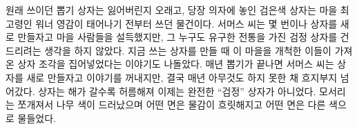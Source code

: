 \documentclass{translation}
\begin{document}
원래 쓰이던 뽑기 상자는 잃어버린지 오래고, 당장 의자에 놓인 검은색 상자는 마을 최고령인 워너 영감이 태어나기 전부터 쓰던 물건이다.
서머스 씨는 몇 번이나 상자를 새로 만들자고 마을 사람들을 설득했지만, 그 누구도 유구한 전통을 가진 검정 상자를 건드리려는 생각을 하지 않았다.
지금 쓰는 상자를 만들 때 이 마을을 개척한 이들이 가져온 상자 조각을 집어넣었다는 이야기도 나돌았다.
매년 뽑기가 끝나면 서머스 씨는 상자를 새로 만들자고 이야기를 꺼내지만, 결국 매년 아무것도 하지 못한 채 흐지부지 넘어갔다.
상자는 해가 갈수록 허름해져 이제는 완전한 ``검정'' 상자가 아니었다.
모서리는 쪼개져서 나무 색이 드러났으며 어떤 면은 물감이 흐릿해지고 어떤 면은 다른 색으로 물들었다.
\end{document}
